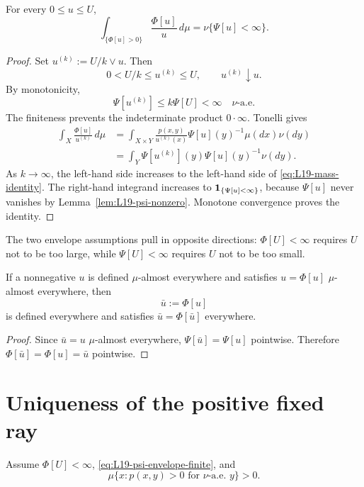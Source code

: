 \begin{lemma}\label{lem:L19-mass-identity}
For every $0\le u\le U$,
\begin{equation}\label{eq:L19-mass-identity}
 \int_{\{\Phi[u]>0\}}\frac{\Phi[u]}{u}\,d\mu
 =\nu\{\Psi[u]<\infty\}.
\end{equation}
\end{lemma}
\begin{proof}
Set $u^{(k)}:=U/k\vee u$.  Then
\[
 0<U/k\le u^{(k)}\le U,
 \qquad
 u^{(k)}\downarrow u.
\]
By monotonicity,
\[
 \Psi[u^{(k)}]\le k\Psi[U]<\infty
 \quad\nu\text{-a.e.}
\]
The finiteness prevents the indeterminate product $0\cdot\infty$.  Tonelli gives
\begin{align*}
 \int_X\frac{\Phi[u]}{u^{(k)}}\,d\mu
 &=\int_{X\times Y}
   \frac{p(x,y)}{u^{(k)}(x)}\Psi[u](y)^{-1}\mu(dx)\nu(dy)\\
 &=\int_Y\Psi[u^{(k)}](y)\Psi[u](y)^{-1}\nu(dy).
\end{align*}
As $k\to\infty$, the left-hand side increases to the left-hand side of \eqref{eq:L19-mass-identity}.  The right-hand integrand increases to $\mathbf{1}_{\{\Psi[u]<\infty\}}$, because $\Psi[u]$ never vanishes by Lemma~\ref{lem:L19-psi-nonzero}.  Monotone convergence proves the identity.
\end{proof}

The two envelope assumptions pull in opposite directions: $\Phi[U]<\infty$ requires $U$ not to be too large, while $\Psi[U]<\infty$ requires $U$ not to be too small.

\begin{lemma}\label{lem:L19-ae-everywhere}
If a nonnegative $u$ is defined $\mu$-almost everywhere and satisfies $u=\Phi[u]$ $\mu$-almost everywhere, then
\[
 \bar u:=\Phi[u]
\]
is defined everywhere and satisfies $\bar u=\Phi[\bar u]$ everywhere.
\end{lemma}
\begin{proof}
Since $\bar u=u$ $\mu$-almost everywhere, $\Psi[\bar u]=\Psi[u]$ pointwise.  Therefore $\Phi[\bar u]=\Phi[u]=\bar u$ pointwise.
\end{proof}

\section{Uniqueness of the positive fixed ray}
Assume $\Phi[U]<\infty$, \eqref{eq:L19-psi-envelope-finite}, and
\begin{equation}\label{eq:L19-common-positive-row}
 \mu\{x:p(x,y)>0\text{ for $\nu$-a.e. }y\}>0.
\end{equation}

